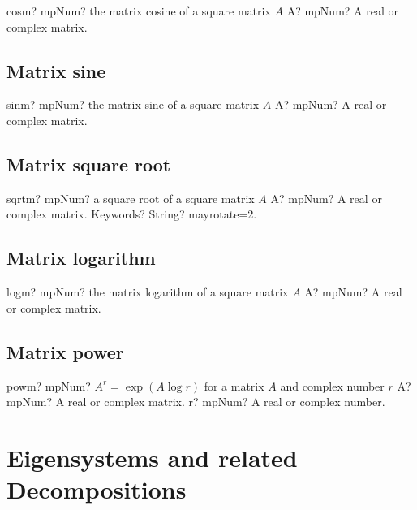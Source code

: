 \documentclass[12pt,a4paper,openany]{book}
\begin{document}
\begin{mpFunctionsExtract}
\mpFunctionOne
{cosm? mpNum? the matrix cosine of a square matrix $A$}
{A? mpNum? A real or complex matrix.}
\end{mpFunctionsExtract}

\section{Matrix sine}

\begin{mpFunctionsExtract}
\mpFunctionOne
{sinm? mpNum? the matrix sine of a square matrix $A$}
{A? mpNum? A real or complex matrix.}
\end{mpFunctionsExtract}

\section{Matrix square root}

\begin{mpFunctionsExtract}
\mpFunctionTwo
{sqrtm? mpNum? a square root of a square matrix $A$}
{A? mpNum? A real or complex matrix.}
{Keywords? String?  mayrotate=2.}
\end{mpFunctionsExtract}

\section{Matrix logarithm}

\begin{mpFunctionsExtract}
\mpFunctionOne
{logm? mpNum? the matrix logarithm of a square matrix $A$}
{A? mpNum? A real or complex matrix.}
\end{mpFunctionsExtract}

\section{Matrix power}

\begin{mpFunctionsExtract}
\mpFunctionTwo
{powm? mpNum? $A^r=\exp(A \log r)$ for a matrix $A$ and complex number $r$}
{A? mpNum? A real or complex matrix.}
{r? mpNum? A real or complex number.}
\end{mpFunctionsExtract}

\chapter{Eigensystems and related Decompositions}
\end{document}
